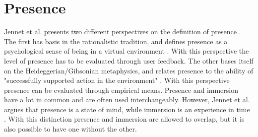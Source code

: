     \section{Presence} %
    Jennet et al. presents two different perspectives on the definition of presence \cite{Jennett2008}. The first has basis in the rationalistic tradition, and defines presence as a psychological sense of being in a virtual environment \cite{Slater1994}. With this perspective the level of presence has to be evaluated through user feedback. The other bases itself on the Heideggerian/Gibsonian metaphysics, and relates presence to the ability of "successfully supported action in the environment" \cite{Zahorik1998}. With this perspective presence can be evaluated through empirical means. Presence and immersion have a lot in common and are often used interchangeably. However, Jennet et al. argues that presence is a state of mind, while immersion is an experience in time \cite{Jennett2008}. With this distinction presence and immersion are allowed to overlap, but it is also possible to have one without the other.
    
